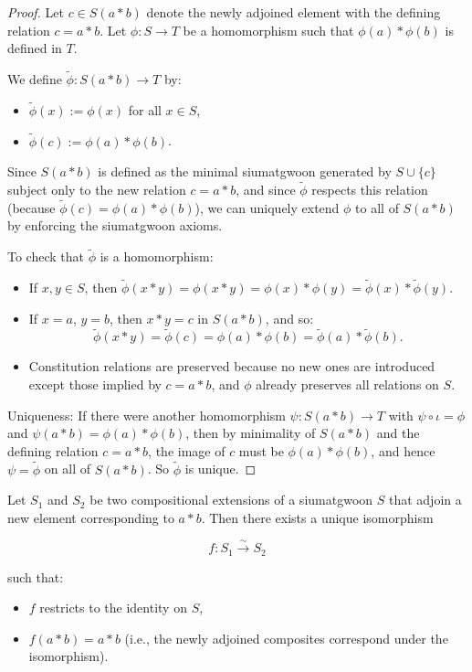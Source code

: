 \begin{proof}
Let $c \in S(a*b)$ denote the newly adjoined element with the defining relation $c = a * b$. Let $\phi: S \to T$ be a homomorphism such that $\phi(a) * \phi(b)$ is defined in $T$.

We define $\widetilde{\phi}: S(a*b) \to T$ by:
\begin{itemize}
\item $\widetilde{\phi}(x) := \phi(x)$ for all $x \in S$,
\item $\widetilde{\phi}(c) := \phi(a) * \phi(b)$.
\end{itemize}

Since $S(a*b)$ is defined as the minimal siumatgwoon generated by $S \cup \{c\}$ subject only to the new relation $c = a * b$, and since $\widetilde{\phi}$ respects this relation (because $\widetilde{\phi}(c) = \phi(a) * \phi(b)$), we can uniquely extend $\phi$ to all of $S(a*b)$ by enforcing the siumatgwoon axioms.

To check that $\widetilde{\phi}$ is a homomorphism:

\begin{itemize}
\item If $x, y \in S$, then $\widetilde{\phi}(x * y) = \phi(x * y) = \phi(x) * \phi(y) = \widetilde{\phi}(x) * \widetilde{\phi}(y)$.
\item If $x = a$, $y = b$, then $x * y = c$ in $S(a*b)$, and so:
$$
\widetilde{\phi}(x * y) = \widetilde{\phi}(c) = \phi(a) * \phi(b) = \widetilde{\phi}(a) * \widetilde{\phi}(b).
$$
\item Constitution relations are preserved because no new ones are introduced except those implied by $c = a * b$, and $\phi$ already preserves all relations on $S$.
\end{itemize}

Uniqueness: If there were another homomorphism $\psi: S(a*b) \to T$ with $\psi \circ \iota = \phi$ and $\psi(a * b) = \phi(a) * \phi(b)$, then by minimality of $S(a*b)$ and the defining relation $c = a * b$, the image of $c$ must be $\phi(a) * \phi(b)$, and hence $\psi = \widetilde{\phi}$ on all of $S(a*b)$. So $\widetilde{\phi}$ is unique.
\end{proof}

\begin{corollary}
Let $S_1$ and $S_2$ be two compositional extensions of a siumatgwoon $S$ that adjoin a new element corresponding to $a * b$. Then there exists a unique isomorphism

$$
f: S_1 \xrightarrow{\sim} S_2
$$

such that:
\begin{itemize}
\item $f$ restricts to the identity on $S$,
\item $f(a * b) = a * b$ (i.e., the newly adjoined composites correspond under the isomorphism).
\end{itemize}
\end{corollary}

